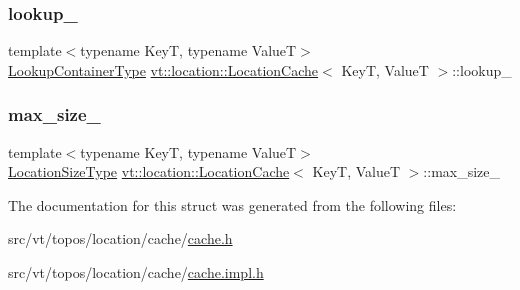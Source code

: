 \mbox{\label{structvt_1_1location_1_1_location_cache_a66ca0e925c2fe39cbe1f309159094c96}} 
\subsubsection{\texorpdfstring{lookup\+\_\+}{lookup\_}}
{\footnotesize\ttfamily template$<$typename KeyT, typename ValueT$>$ \\
\hyperlink{structvt_1_1location_1_1_location_cache_af56948d938dcc38705b777a96b3100be}{Lookup\+Container\+Type} \hyperlink{structvt_1_1location_1_1_location_cache}{vt\+::location\+::\+Location\+Cache}$<$ KeyT, ValueT $>$\+::lookup\+\_\+\hspace{0.3cm}{\ttfamily [private]}}

\mbox{\label{structvt_1_1location_1_1_location_cache_ad0073d311deb0afe733c3d35f1f7f912}} 
\subsubsection{\texorpdfstring{max\+\_\+size\+\_\+}{max\_size\_}}
{\footnotesize\ttfamily template$<$typename KeyT, typename ValueT$>$ \\
\hyperlink{namespacevt_1_1location_ab1c4c5849012a23eee2fbd1fce6159d7}{Location\+Size\+Type} \hyperlink{structvt_1_1location_1_1_location_cache}{vt\+::location\+::\+Location\+Cache}$<$ KeyT, ValueT $>$\+::max\+\_\+size\+\_\+\hspace{0.3cm}{\ttfamily [private]}}



The documentation for this struct was generated from the following files\+:\begin{DoxyCompactItemize}
\item 
src/vt/topos/location/cache/\hyperlink{topos_2location_2cache_2cache_8h}{cache.\+h}\item 
src/vt/topos/location/cache/\hyperlink{cache_8impl_8h}{cache.\+impl.\+h}\end{DoxyCompactItemize}
